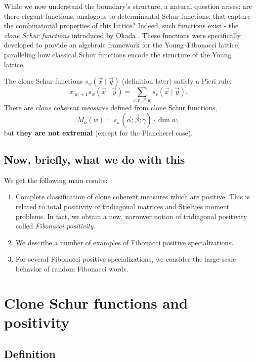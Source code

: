 \documentclass[letterpaper,11pt,oneside,reqno]{article}
\numberwithin{equation}{section}
\theoremstyle{definition}
\begin{document}
While we now understand the boundary's structure, a natural question arises: are there
elegant functions, analogous to determinantal Schur functions, that capture the
combinatorial properties of this lattice? Indeed, such functions exist - the
\emph{clone Schur functions} introduced by Okada \cite{okada1994algebras}. These
functions were specifically developed to provide an algebraic framework for the
Young--Fibonacci lattice, paralleling how classical Schur functions encode the
structure of the Young lattice.

The clone Schur functions $s_w(\vec x\mid \vec y)$
(definition later)
satisfy a Pieri rule:
\begin{equation*}
	x_{|w|+1}s_w(\vec x\mid \vec y)=\sum_{v\colon v\nearrow w}s_v(\vec x\mid \vec y).
\end{equation*}
There are \emph{clone coherent measures} defined from clone Schur functions,
\begin{equation*}
	M_n(w)=s_w(\vec \alpha;\vec \beta;\gamma)\cdot \dim w,
\end{equation*}
but \textbf{they are not extremal} (except for the Plancherel case).

\subsection{Now, briefly, what we do with this}

We get the following main results:
\begin{enumerate}
	\item Complete classification of
		clone coherent measures which are positive.
		This is related to total positivity of tridiagonal matrices and Stieltjes moment
		problems.
		In fact, we obtain a new, narrower notion of tridiagonal
		positivity called \emph{Fibonacci positivity}.
	\item We describe a number of examples of Fibonacci positive specializations.
	\item For several Fibonacci positive specializations, we consider the large-scale behavior of random Fibonacci words.
\end{enumerate}

\section{Clone Schur functions and positivity}

\subsection{Definition}
\end{document}
